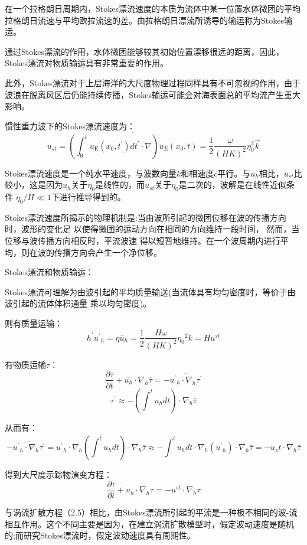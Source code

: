 \documentclass{article}
\begin{document}
在一个拉格朗日周期内，Stokes漂流速度的本质为流体中某一位置水体微团的平均拉格朗日流速与平均欧拉流速的差。由拉格朗日漂流所诱导的输运称为Stokes输运。

通过Stokes漂流的作用，水体微团能够较其初始位置漂移很远的距离，因此，Stokes漂流对物质输运具有非常重要的作用。

此外，Stokes漂流对于上层海洋的大尺度物理过程同样具有不可忽视的作用，由于波浪在脱离风区后仍能持续传播，Stokes输运可能会对海表面总的平均流产生重大影响。

惯性重力波下的Stokes漂流速度为：
$$u_{st}=\overline{(\int_{0}^{t}{{{u}_{\text{E}}}({{x}_{0}},t^{\prime})}dt^{\prime}\cdot \nabla ){{u}_{E}}({{x}_{0}},t)} = \frac{1}{2}\frac{\omega}{(HK)^2}\eta_0^2\vec{k}$$

Stokes漂流速度是一个纯水平速度，与波数向量$k$和相速度$c$平行。与$u_h$相比，$u_{st}$比较小，这是因为$u_h$关于$\eta_0$是线性的，而$u_{st}$关于$\eta_0$是二次的，波解是在线性近似条件 $\eta_0/H \ll 1$下进行推导得到的。

Stokes漂流速度所揭示的物理机制是:当由波所引起的微团位移在波的传播方向时，波形的变化足
以使得微团的运动方向在相同的方向维持一段时间， 然而，当位移与波传播方向相反时，平流波速
得以短暂地维持。在一个波周期内进行平均，则在波的传播方向会产生一个净位移。

Stokes漂流和物质输运：

Stokes漂流可理解为由波引起的平均质量输送(当流体具有均匀密度时，等价于由波引起的流体体积通量 乘以均匀密度)。

则有质量运输：
$$\overline{h^{\prime}{{{{u}^{\prime}}}_{h}}}=\overline{\eta{{{u}}_{h}}}=\frac{1}{2}\frac{H\omega }{{{(HK)}^{2}}}{{\eta }_{0}}^{2}k=H{{u}^{st}}$$

有物质运输$\tau$：
$$\frac{\partial \overline{\tau }}{\partial t}+\overline{{{u}_{h}}}\cdot {{\nabla }_{h}}\overline{\tau }=-\overline{{{{{u}^{\prime}}}_{h}}\cdot {{\nabla }_{h}}\tau ^{\prime}}$$
$$\tau^{\prime}\approx-(\int^tu_hdt)\cdot{\nabla }_{h}\bar{\tau} $$

从而有：
$$-\overline{{{{{u}^{\prime}}}_{h}}\cdot {{\nabla }_{h}}\tau ^{\prime}} = \overline{{{{{u}^{\prime}}}_{h}}\cdot {{\nabla }_{h}}(\int^tu_hdt)\cdot{\nabla }_{h}\bar{\tau}}\approx-\int^tu_hdt\cdot {{\nabla }_{h}}({{{{u}^{\prime}}}_{h}})\cdot{\nabla }_{h}\bar{\tau}=-u_st\cdot {{\nabla }_{h}}\bar{\tau}$$

得到大尺度示踪物演变方程：
$$\frac{\partial \tau }{\partial t}+{{u}_{h}}\cdot {{\nabla }_{h}}\tau =-{{u}^{st}}\cdot {{\nabla }_{h}}\tau$$

与涡流扩散方程（2.5）相比，由Stokes漂流所引起的平流是一种极不相同的波-流相互作用。这个不同主要是因为，在建立涡流扩散模型时，假定波动速度是随机的;而研究Stokes漂流时，假定波动速度具有周期性。
\end{document}
